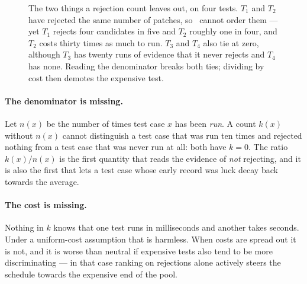 \begin{figure}[htbp]
{}
\caption[Why a count of rejections is not enough]{The two things a rejection
count leaves out, on four tests. $T_1$ and $T_2$ have rejected the same number
of patches, so \frtp\ cannot order them --- yet $T_1$ rejects four candidates
in five and $T_2$ roughly one in four, and $T_2$ costs thirty times as much to
run. $T_3$ and $T_4$ also tie at zero, although $T_3$ has twenty runs of
evidence that it never rejects and $T_4$ has none. Reading the denominator
breaks both ties; dividing by cost then demotes the expensive test.}
\label{fig:frtp-gaps}
\end{figure}

\paragraph{The denominator is missing.} Let $n(x)$ be the number of times test
case $x$ has been \emph{run}. A count $k(x)$ without $n(x)$ cannot distinguish a
test case that was run ten times and rejected nothing from a test case that was
never run at all: both have $k = 0$. The ratio $k(x)/n(x)$ is the first quantity
that reads the evidence of \emph{not} rejecting, and it is also the first that
lets a test case whose early record was luck decay back towards the average.

\paragraph{The cost is missing.} Nothing in $k$ knows that one test runs in
milliseconds and another takes seconds. Under a uniform-cost assumption that is
harmless. When costs are spread out it is not, and it is worse than neutral if
expensive tests also tend to be more discriminating --- in that case ranking on
rejections alone actively steers the schedule towards the expensive end of the
pool.

